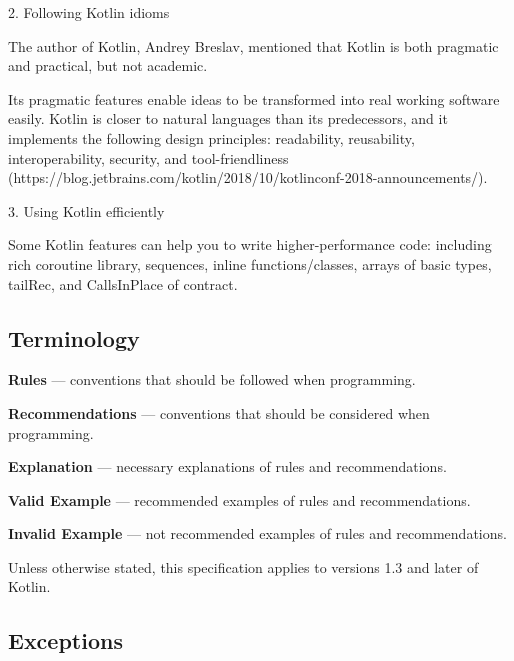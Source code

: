 {{{{{{{{{{{{{{{{2. Following Kotlin idioms



    The author of Kotlin, Andrey Breslav, mentioned that Kotlin is both pragmatic and practical, but not academic. 

    Its pragmatic features enable ideas to be transformed into real working software easily. Kotlin is closer to natural languages than its predecessors, and it implements the following design principles: readability, reusability, interoperability, security, and tool-friendliness (https://blog.jetbrains.com/kotlin/2018/10/kotlinconf-2018-announcements/).



3. Using Kotlin efficiently



    Some Kotlin features can help you to write higher-performance code: including rich coroutine library, sequences, inline functions/classes, arrays of basic types, tailRec, and CallsInPlace of contract.



\subsection*{\textbf{Terminology}}

\label{sec:}



\textbf{Rules} — conventions that should be followed when programming.



\textbf{Recommendations} — conventions that should be considered when programming.



\textbf{Explanation} — necessary explanations of rules and recommendations.



\textbf{Valid Example} — recommended examples of rules and recommendations.



\textbf{Invalid Example} — not recommended examples of rules and recommendations.



Unless otherwise stated, this specification applies to versions 1.3 and later of Kotlin.



\subsection*{\textbf{Exceptions}}

}}}}}}}}}}}}}}}}

